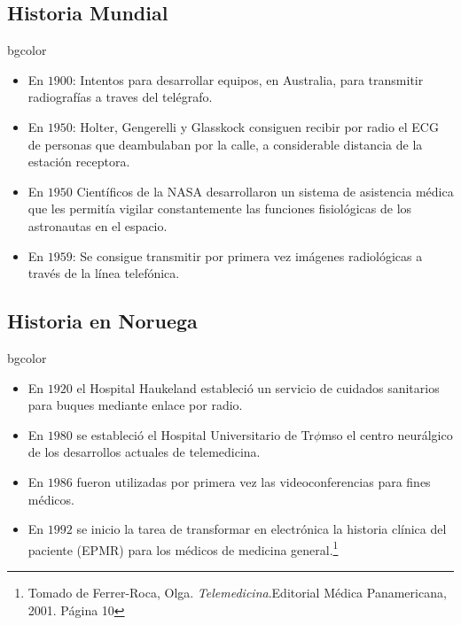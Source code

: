 \documentclass[xcolor=svgnames]{beamer}
\begin{document}
\subsection{Historia Mundial}
\begin{frame}
\begin{beamercolorbox}[rounded=true, center, shadow=true]{bgcolor}
  \begin{itemize}
   \item En $1900$: Intentos para desarrollar equipos, en Australia, para transmitir radiografías a traves del telégrafo. \pause
   \item En $1950$: Holter, Gengerelli y Glasskock consiguen recibir por radio el ECG de personas que deambulaban por la calle, a considerable distancia de la estación receptora. \pause
   \item En $1950$ Científicos de la NASA desarrollaron un sistema de asistencia médica que les permitía vigilar constantemente las funciones fisiológicas de los astronautas en el espacio. \pause
   \item En $1959$: Se consigue transmitir por primera vez imágenes radiológicas a través de la línea telefónica.
  \end{itemize}
\end{beamercolorbox}
\end{frame}

\subsection{Historia en Noruega}
\begin{frame}
  \begin{beamercolorbox}[rounded=true, center, shadow=true]{bgcolor}
    \begin{itemize}
      \item En $1920$ el Hospital Haukeland estableció un servicio de cuidados sanitarios para buques mediante enlace por radio. \pause
      \item En $1980$ se estableció el Hospital Universitario de Tr$\phi$mso el centro neurálgico de los desarrollos actuales de telemedicina.\pause
      \item En $1986$ fueron utilizadas por primera vez las videoconferencias para fines médicos. \pause
      \item En $1992$ se inicio la tarea de transformar en electrónica la historia clínica del paciente (EPMR) para los médicos de medicina general.\footnote{Tomado de Ferrer-Roca, Olga. \textit{ Telemedicina}.Editorial Médica Panamericana, 2001. Página 10}
    \end{itemize}
  \end{beamercolorbox}
\end{frame}
\end{document}
